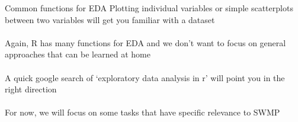 \documentclass[xcolor=svgnames]{beamer}\usepackage[]{graphicx}\usepackage[]{color}
\makeatletter
\newcommand{\hlstr}[1]{\textcolor[rgb]{0.192,0.494,0.8}{#1}}%
\newcommand{\hlcom}[1]{\textcolor[rgb]{0.678,0.584,0.686}{\textit{#1}}}%
\newcommand{\hlopt}[1]{\textcolor[rgb]{0,0,0}{#1}}%
\newcommand{\hlstd}[1]{\textcolor[rgb]{0.345,0.345,0.345}{#1}}%
\newcommand{\hlkwc}[1]{\textcolor[rgb]{0.333,0.667,0.333}{#1}}%
\newcommand{\hlkwd}[1]{\textcolor[rgb]{0.737,0.353,0.396}{\textbf{#1}}}%
\newenvironment{kframe}{%
 \def\at@end@of@kframe{}%
 \ifinner\ifhmode%
  \def\at@end@of@kframe{\end{minipage}}%
  \begin{minipage}{\columnwidth}%
 \fi\fi%
 \def\FrameCommand##1{\hskip\@totalleftmargin \hskip-\fboxsep
 \colorbox{shadecolor}{##1}\hskip-\fboxsep
     \hskip-\linewidth \hskip-\@totalleftmargin \hskip\columnwidth}%
 \MakeFramed {\advance\hsize-\width
   \@totalleftmargin\z@ \linewidth\hsize
   \@setminipage}}%
 {\par\unskip\endMakeFramed%
 \at@end@of@kframe}
\newenvironment{knitrout}{}{} %
\makeatother
\begin{document}

\begin{frame}{Common functions for EDA}
Plotting individual variables or simple scatterplots between two variables will get you familiar with a dataset\\~\\
Again, R has many functions for EDA and we don't want to focus on general approaches that can be learned at home \\~\\
A quick google search of `exploratory data analysis in r' will point you in the right direction \\~\\
For now, we will focus on some tasks that have specific relevance to SWMP
\end{frame}
\end{document}

